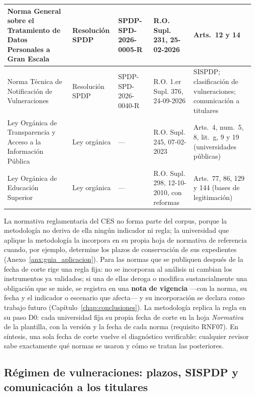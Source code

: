 \begin{table}[htbp]
\begin{tabularx}{\textwidth}{|L|>{\raggedright\arraybackslash}p{1.4cm}|>{\raggedright\arraybackslash}p{2.0cm}|>{\raggedright\arraybackslash}p{2.1cm}|>{\raggedright\arraybackslash}p{3.0cm}|}
    Norma General sobre el Tratamiento de Datos Personales a Gran Escala \cite{spdp2026granescala} & Resolución SPDP & SPDP-SPD-2026-0005-R & R.O. Supl. 231, 25-02-2026 & Arts.~12 y 14 \\ \hline
    Norma Técnica de Notificación de Vulneraciones \cite{spdp2026vulneraciones} & Resolución SPDP & SPDP-SPD-2026-0040-R & R.O. 1.er Supl. 376, 24-09-2026 & SISPDP; clasificación de vulneraciones; comunicación a titulares \\ \hline
    Ley Orgánica de Transparencia y Acceso a la Información Pública \cite{lotaip2023} & Ley orgánica & --- & R.O. Supl. 245, 07-02-2023 & Arts.~4, num.~5, 8, lit.~g, 9 y 19 (universidades públicas) \\ \hline
    Ley Orgánica de Educación Superior \cite{loes2010} & Ley orgánica & --- & R.O. Supl. 298, 12-10-2010, con reformas & Arts.~77, 86, 129 y 144 (bases de legitimación) \\ \hline
  \end{tabularx}
  \raggedright
\end{table}

La normativa reglamentaria del CES no forma parte del corpus, porque la metodología no deriva de ella ningún indicador ni regla; la universidad que aplique la metodología la incorpora en su propia hoja de normativa de referencia cuando, por ejemplo, determine los plazos de conservación de sus expedientes (Anexo~\ref{anx:guia_aplicacion}). Para las normas que se publiquen después de la fecha de corte rige una regla fija: no se incorporan al análisis ni cambian los instrumentos ya validados; si una de ellas deroga o modifica sustancialmente una obligación que se mide, se registra en una \textbf{nota de vigencia} ---con la norma, su fecha y el indicador o escenario que afecta--- y su incorporación se declara como trabajo futuro (Capítulo~\ref{chap:conclusiones}). La metodología replica la regla en su paso D0: cada universidad fija su propia fecha de corte en la hoja \textit{Normativa} de la plantilla, con la versión y la fecha de cada norma (requisito RNF07). En síntesis, una sola fecha de corte vuelve el diagnóstico verificable: cualquier revisor sabe exactamente qué normas se usaron y cómo se tratan las posteriores.


\subsection{Régimen de vulneraciones: plazos, SISPDP y comunicación a los titulares}
\label{sec:regimen_vulneraciones}

